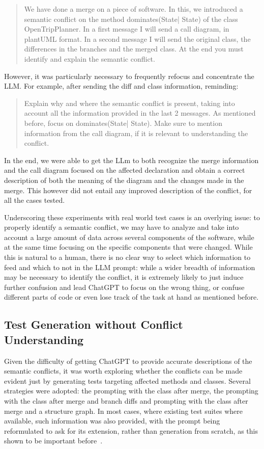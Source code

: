 \begin{quote}
We have done a merge on a piece of software. In this, we introduced a semantic conflict on the method dominates(State| State) of the class OpenTripPlanner. In a first message I will send a call diagram, in plantUML format. In a second message I will send the original class, the differences in the branches and the merged class.  At the end you must identify and explain the semantic conflict.
\end{quote}

However, it was particularly necessary to frequently refocus and concentrate the LLM. For example, after sending the diff and class information, reminding:

\begin{quote}
Explain why and where the semantic conflict is present, taking into account all the information provided in the last 2 messages. As mentioned before, focus on dominates(State| State). Make sure to mention information from the call diagram, if it is relevant to understanding the conflict.
\end{quote}

In the end, we were able to get the LLm to both recognize the merge information and the call diagram focused on the affected declaration and obtain a correct description of both the meaning of the diagram and the changes made in the merge. This however did not entail any improved description of the conflict, for all the cases tested.

Underscoring these experiments with real world test cases is an overlying issue: to properly identify a semantic conflict, we may have to analyze and take into account a large amount of data across several components of the software, while at the same time focusing on the specific components that were changed. While this is natural to a human, there is no clear way to select which information to feed and which to not in the LLM prompt: while a wider breadth of information may be necessary to identify the conflict, it is extremely likely to just induce further confusion and lead ChatGPT to focus on the wrong thing, or confuse different parts of code or even lose track of the task at hand as mentioned before.

\subsection{Test Generation without Conflict Understanding}

Given the difficulty of getting ChatGPT to provide accurate descriptions of the semantic conflicts, it was worth exploring whether the conflicts can be made evident just by generating tests targeting affected methods and classes. Several strategies were adopted: the prompting with the class after merge, the prompting with the class after merge and branch diffs and prompting with the class after merge and a structure graph. In most cases, where existing test suites where available, such information was also provided, with the prompt being reformulated to ask for its extension, rather than generation from scratch, as this shown to be important before~\cite{kn:githubcopilot}.

